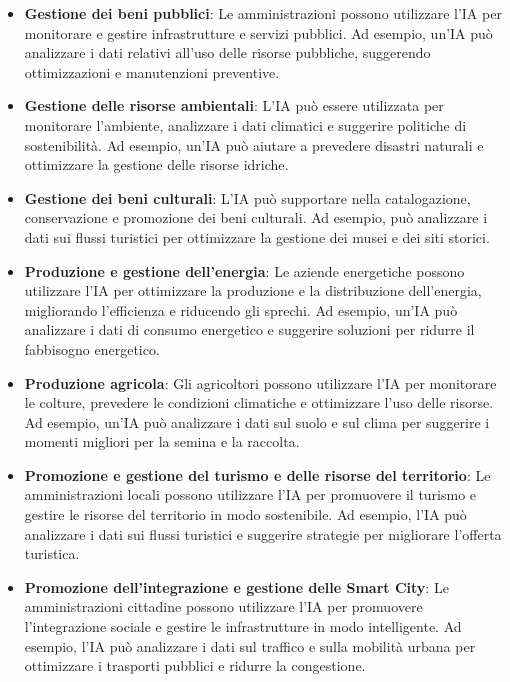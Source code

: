         \begin{itemize}
            \item \textbf{Gestione dei beni pubblici}: Le amministrazioni possono utilizzare l'IA per monitorare e gestire infrastrutture e servizi pubblici. Ad esempio, un'IA può analizzare i dati relativi all'uso delle risorse pubbliche, suggerendo ottimizzazioni e manutenzioni preventive.
    
            \item \textbf{Gestione delle risorse ambientali}: L'IA può essere utilizzata per monitorare l'ambiente, analizzare i dati climatici e suggerire politiche di sostenibilità. Ad esempio, un'IA può aiutare a prevedere disastri naturali e ottimizzare la gestione delle risorse idriche.
            
            \item \textbf{Gestione dei beni culturali}: L'IA può supportare nella catalogazione, conservazione e promozione dei beni culturali. Ad esempio, può analizzare i dati sui flussi turistici per ottimizzare la gestione dei musei e dei siti storici.
            
            \item \textbf{Produzione e gestione dell'energia}: Le aziende energetiche possono utilizzare l'IA per ottimizzare la produzione e la distribuzione dell'energia, migliorando l'efficienza e riducendo gli sprechi. Ad esempio, un'IA può analizzare i dati di consumo energetico e suggerire soluzioni per ridurre il fabbisogno energetico.
            
            \item \textbf{Produzione agricola}: Gli agricoltori possono utilizzare l'IA per monitorare le colture, prevedere le condizioni climatiche e ottimizzare l'uso delle risorse. Ad esempio, un'IA può analizzare i dati sul suolo e sul clima per suggerire i momenti migliori per la semina e la raccolta.
            
            \item \textbf{Promozione e gestione del turismo e delle risorse del territorio}: Le amministrazioni locali possono utilizzare l'IA per promuovere il turismo e gestire le risorse del territorio in modo sostenibile. Ad esempio, l'IA può analizzare i dati sui flussi turistici e suggerire strategie per migliorare l'offerta turistica.
            
            \item \textbf{Promozione dell'integrazione e gestione delle Smart City}: Le amministrazioni cittadine possono utilizzare l'IA per promuovere l'integrazione sociale e gestire le infrastrutture in modo intelligente. Ad esempio, l'IA può analizzare i dati sul traffico e sulla mobilità urbana per ottimizzare i trasporti pubblici e ridurre la congestione.
        \end{itemize}
